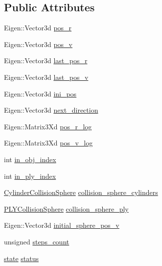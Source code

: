 \subsection*{Public Attributes}
\begin{DoxyCompactItemize}
\item 
Eigen\+::\+Vector3d \hyperlink{class_walker_a1008a95833c1f74b53f02e57e84417b7}{pos\+\_\+r}
\item 
Eigen\+::\+Vector3d \hyperlink{class_walker_a2c1bf5a8da9e8f3a230a22ab4ae0e373}{pos\+\_\+v}
\item 
Eigen\+::\+Vector3d \hyperlink{class_walker_a8c78216899e04e9439a991cbad9df36f}{last\+\_\+pos\+\_\+r}
\item 
Eigen\+::\+Vector3d \hyperlink{class_walker_a2d50601346a754183b38890c18e7a6e7}{last\+\_\+pos\+\_\+v}
\item 
Eigen\+::\+Vector3d \hyperlink{class_walker_a98116f0e5d65e1cf65449d80a2d87617}{ini\+\_\+pos}
\item 
Eigen\+::\+Vector3d \hyperlink{class_walker_ad1629485a13c80367a563ed7b88149eb}{next\+\_\+direction}
\item 
Eigen\+::\+Matrix3\+Xd \hyperlink{class_walker_a1ba5a46fddf62eb3eeaabc7c868afe07}{pos\+\_\+r\+\_\+log}
\item 
Eigen\+::\+Matrix3\+Xd \hyperlink{class_walker_a62d99cc92226681123be94e64fb2bf7b}{pos\+\_\+v\+\_\+log}
\item 
int \hyperlink{class_walker_adf221f7a635c09cfaafc0dab5aa38106}{in\+\_\+obj\+\_\+index}
\item 
int \hyperlink{class_walker_a48d0fe08f2297d9ad56cfaec9ee1926c}{in\+\_\+ply\+\_\+index}
\item 
\hyperlink{class_cylinder_collision_sphere}{Cylinder\+Collision\+Sphere} \hyperlink{class_walker_a28d139085430c9a11e0a70be2c3083af}{collision\+\_\+sphere\+\_\+cylinders}
\item 
\hyperlink{class_p_l_y_collision_sphere}{P\+L\+Y\+Collision\+Sphere} \hyperlink{class_walker_a8aecfb76c9007eb6da99b024bc5e425d}{collision\+\_\+sphere\+\_\+ply}
\item 
Eigen\+::\+Vector3d \hyperlink{class_walker_a8a27ead68d3dc7140afbec2710fb3176}{initial\+\_\+sphere\+\_\+pos\+\_\+v}
\item 
unsigned \hyperlink{class_walker_a83536011f160b42f6c39f121ee550731}{steps\+\_\+count}
\item 
\hyperlink{class_walker_afcad3f5c11d0bd045de22fb0347dc44c}{state} \hyperlink{class_walker_afa37629b74387435a0bb02e0c061a718}{status}
\item 

\end{DoxyCompactItemize}
